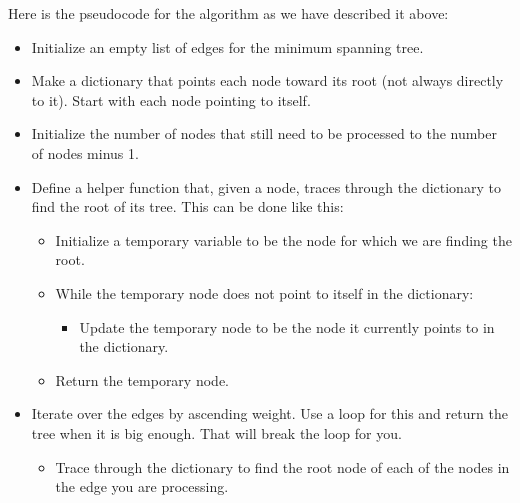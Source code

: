 Here is the pseudocode for the algorithm as we have described it above:

\begin{itemize}


\item Initialize an empty list of edges for the minimum spanning tree.

\item Make a dictionary that points each node toward its root (not always directly to it).
Start with each node pointing to itself.

\item Initialize the number of nodes that still need to be processed to the number of nodes minus 1.

\item Define a helper function that, given a node, traces through the dictionary to find the root of its tree.
This can be done like this:

	\begin{itemize}

	\item Initialize a temporary variable to be the node for which we are finding the root.

	\item While the temporary node does not point to itself in the dictionary:

		\begin{itemize}

		\item Update the temporary node to be the node it currently points to in the dictionary.

		\end{itemize}

	\item Return the temporary node.

	\end{itemize}

\item Iterate over the edges by ascending weight.
Use a  loop for this and return the tree when it is big enough.
That will break the loop for you.

	\begin{itemize}

	\item Trace through the dictionary to find the root node of each of the nodes in the edge you are processing.


\end{itemize}
\end{itemize}
